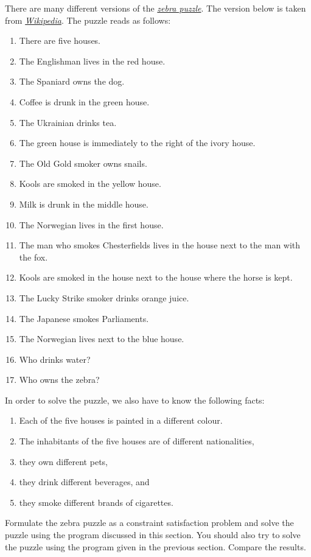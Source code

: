 \exercise
There are many different versions of the \href{https://en.wikipedia.org/wiki/Zebra_Puzzle}{\emph{zebra puzzle}}.  
The version below is taken from \href{https://en.wikipedia.org/wiki/Zebra_Puzzle}{\emph{Wikipedia}}.  The
puzzle reads as follows:
\begin{enumerate}
\item There are five houses.
\item The Englishman lives in the red house.
\item The Spaniard owns the dog.
\item Coffee is drunk in the green house.
\item The Ukrainian drinks tea.
\item The green house is immediately to the right of the ivory house.
\item The Old Gold smoker owns snails.
\item Kools are smoked in the yellow house.
\item Milk is drunk in the middle house.
\item The Norwegian lives in the first house.
\item The man who smokes Chesterfields lives in the house next to the man with the fox.
\item Kools are smoked in the house next to the house where the horse is kept.
\item The Lucky Strike smoker drinks orange juice.
\item The Japanese smokes Parliaments.
\item The Norwegian lives next to the blue house.
\item Who drinks water? 
\item Who owns the zebra?
\end{enumerate}
In order to solve the puzzle, we also have to know the following facts:
\begin{enumerate}
\item Each of the five houses is painted in a {\color{blue}different} colour.
\item The inhabitants of the five houses are of {\color{blue}different} nationalities,
\item they own {\color{blue}different} pets, 
\item they drink {\color{blue}different} beverages, and 
\item they smoke {\color{blue}different} brands of cigarettes. 
\end{enumerate}
Formulate the zebra puzzle as a constraint satisfaction problem and solve the puzzle using the program
discussed in this section.  You should also try to solve the puzzle using the program given in the previous
section.  Compare the results.
\eoxs

